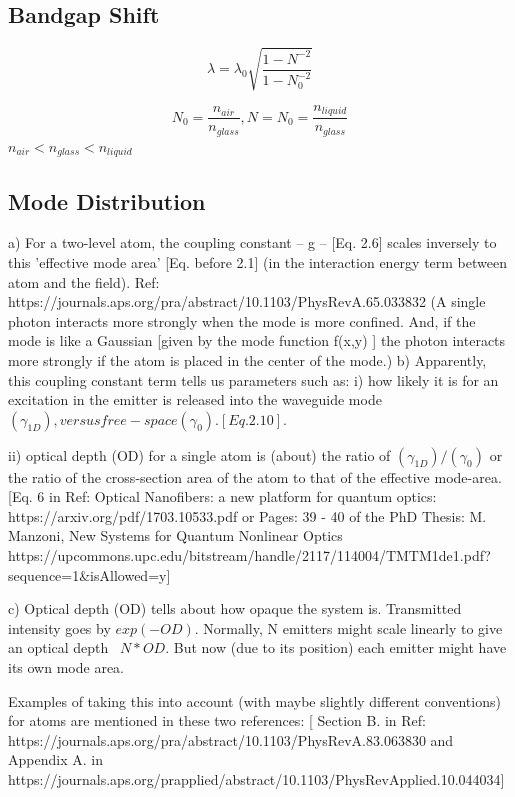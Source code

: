 \subsection{Bandgap Shift}
\begin{equation}
	\lambda = \lambda_0\sqrt{\frac{1-N^{-2}}{1-N_0^{-2}}}
\end{equation}

\begin{equation}
N_0 = \frac{n_{air}}{n_{glass}}, N = N_0 = \frac{n_{liquid}}{n_{glass}} 
\end{equation}
$n_{air} < n_{glass} < n_{liquid}$


\subsection{Mode Distribution}

a) For a two-level atom, the coupling constant -- g -- [Eq. 2.6] scales inversely to this 'effective mode area'  [Eq. before 2.1]  (in the interaction energy term between atom and the field). Ref: https://journals.aps.org/pra/abstract/10.1103/PhysRevA.65.033832
(A single photon interacts more strongly when the mode is more confined. And, if the mode is like a Gaussian [given by the mode function f(x,y) ] the photon interacts more strongly if the atom is placed in the center of the mode.)
b) Apparently, this coupling constant term tells us parameters such as:
 i) how likely it is for an excitation in the emitter is released into the waveguide mode $(\gamma_{1D}), versus free-space (\gamma_0). [Eq. 2.10]. $
 
  ii) optical depth (OD) for a single atom is (about) the ratio of $ (\gamma_{1D})/ (\gamma_{0})$ or the ratio of the cross-section area of the atom to that of the effective mode-area. [Eq. 6 in Ref: Optical Nanofibers: a new platform for quantum optics: https://arxiv.org/pdf/1703.10533.pdf 
  or Pages: 39 - 40 of the PhD Thesis: M. Manzoni, New Systems for Quantum Nonlinear Optics https://upcommons.upc.edu/bitstream/handle/2117/114004/TMTM1de1.pdf?sequence=1\&isAllowed=y]
  
c) Optical depth (OD) tells about how opaque the system is. Transmitted intensity goes by $exp(-OD)$. Normally, N emitters might scale linearly to give an optical depth ~$N*OD$. But now (due to its position) each emitter might have its own mode area.

Examples of taking this into account (with maybe slightly different conventions) for atoms are mentioned in these two references: [ Section B. in Ref: https://journals.aps.org/pra/abstract/10.1103/PhysRevA.83.063830 and Appendix A. in https://journals.aps.org/prapplied/abstract/10.1103/PhysRevApplied.10.044034]


